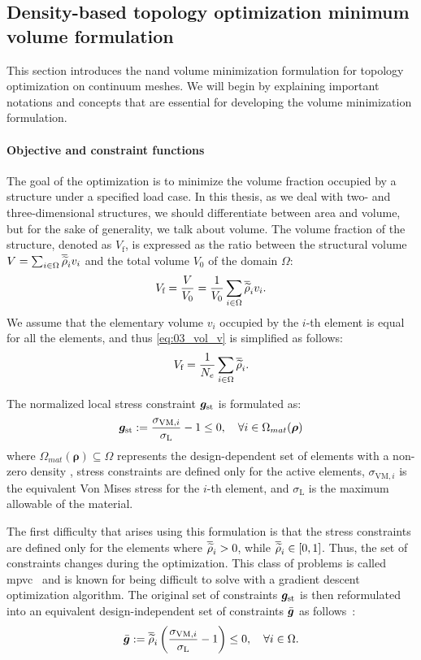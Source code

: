 \subsection{Density-based topology optimization minimum volume formulation}
This section introduces the \gls{nand} volume minimization formulation for topology optimization on continuum meshes. We will begin by explaining important notations and concepts that are essential for developing the volume minimization formulation.
\paragraph{Objective and constraint functions}
The goal of the optimization is to minimize the volume fraction occupied by a structure under a specified load case. In this thesis, as we deal with two- and three-dimensional structures, we should differentiate between area and volume, but for the sake of generality, we talk about volume. The volume fraction of the structure, denoted as $V_\text{f}$, is expressed as the ratio between the structural volume $V=\sum_{i \in \Omega} \overline{\widetilde{\rho}}_i v_i$ and the total volume $V_0$ of the domain $\Omega$:
\begin{equation}
    V_\text{f} = \frac{V}{V_0} = \frac{1}{V_0}\sum_{i \in \Omega} \overline{\widetilde{\rho}}_i v_i.
    \label{eq:03_vol_v}
\end{equation}
We assume that the elementary volume $v_i$ occupied by the $i$-th element is equal for all the elements, and thus \eqref{eq:03_vol_v} is simplified as follows:
\begin{equation}
    V_\text{f} = \frac{1}{N_{e}} \sum_{i \in \Omega} \overline{\widetilde{\rho}}_i. 
    \label{eq:03_obj_vol}  
\end{equation}

The normalized local stress constraint $\bm{g}_{\text{st}}$ is formulated as:
\begin{equation}
    \bm{g}_{\text{st}}:=\frac{\sigma_{\text{VM},i}}{\sigma_\text{L}}-1 \leq 0, \quad \forall i \in \Omega_{mat}(\bm{\rho})
\end{equation}
where $\Omega_{mat}(\bm{\rho}) \subseteq \Omega$ represents the design-dependent set of elements with a non-zero density \ie, stress constraints are defined only for the active elements, $\sigma_{\text{VM},i}$ is the equivalent Von Mises stress for the $i$-th element, and $\sigma_\text{L}$ is the maximum allowable of the material.

The first difficulty that arises using this formulation is that the stress constraints are defined only for the elements where $\overline{\widetilde{\rho}}_i > 0$, while $\overline{\widetilde{\rho}}_i\in[0,1]$. Thus, the set of constraints changes during the optimization. This class of problems is called \acrfull{mpvc}~ and is known for being difficult to solve with a gradient descent optimization algorithm. The original set of constraints $\bm{g}_{\text{st}}$ is then reformulated into an equivalent design-independent set of constraints $\bar{\bm{g}}$ as follows~:
\begin{equation}
    \bar{\bm{g}}:=\overline{\widetilde{\rho}}_i\left(\frac{ \sigma_{\text{VM},i}}{\sigma_\text{L}}-1 \right) \leq 0, \quad \forall i \in \Omega.
\end{equation}
